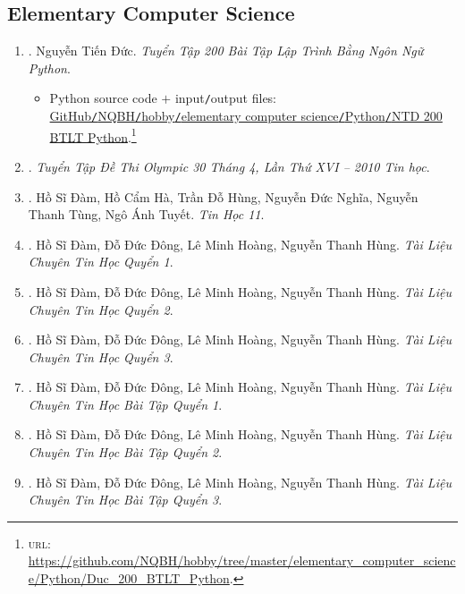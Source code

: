 \documentclass{article}
\begin{document}
\subsection{Elementary Computer Science}

\begin{enumerate}
	\item \cite{Duc_200_BT_Python}. Nguyễn Tiến Đức. {\it Tuyển Tập 200 Bài Tập Lập Trình Bằng Ngôn Ngữ Python}.\hfill{\sf[reading]}
	\begin{itemize}
		\item Python source code $+$ input{\tt/}output files:\\\href{https://github.com/NQBH/hobby/tree/master/elementary_computer_science/Python/Duc_200_BTLT_Python}{GitHub{\tt/}NQBH{\tt/}hobby{\tt/}elementary computer science{\tt/}Python{\tt/}NTD 200 BTLT Python}.\footnote{\textsc{url}: \url{https://github.com/NQBH/hobby/tree/master/elementary_computer_science/Python/Duc_200_BTLT_Python}.}
	\end{itemize}
	\item \cite{Olympic30-4_2010_Tin_Hoc}. {\it Tuyển Tập Đề Thi Olympic 30 Tháng 4, Lần Thứ XVI -- 2010 Tin học}.\hfill{\sf[reading]}
	\item \cite{SGK_Tin_Hoc_11}. Hồ Sĩ Đàm, Hồ Cẩm Hà, Trần Đỗ Hùng, Nguyễn Đức Nghĩa, Nguyễn Thanh Tùng, Ngô Ánh Tuyết. {\it Tin Học 11}.\\\mbox{}\hfill{\sf[done]}
	\item \cite{TL_chuyen_Tin_quyen_1}. Hồ Sĩ Đàm, Đỗ Đức Đông, Lê Minh Hoàng, Nguyễn Thanh Hùng. {\it Tài Liệu Chuyên Tin Học Quyển 1}.\hfill{\sf[reading]}
	\item \cite{TL_chuyen_Tin_quyen_2}. Hồ Sĩ Đàm, Đỗ Đức Đông, Lê Minh Hoàng, Nguyễn Thanh Hùng. {\it Tài Liệu Chuyên Tin Học Quyển 2}.\hfill{\sf[reading]}
	\item \cite{TL_chuyen_Tin_quyen_3}. Hồ Sĩ Đàm, Đỗ Đức Đông, Lê Minh Hoàng, Nguyễn Thanh Hùng. {\it Tài Liệu Chuyên Tin Học Quyển 3}.\hfill{\sf[reading]}
	\item \cite{TL_chuyen_Tin_BT_quyen_1}. Hồ Sĩ Đàm, Đỗ Đức Đông, Lê Minh Hoàng, Nguyễn Thanh Hùng. {\it Tài Liệu Chuyên Tin Học Bài Tập Quyển 1}.\\\mbox{}\hfill{\sf[reading]}
	\item \cite{TL_chuyen_Tin_BT_quyen_2}. Hồ Sĩ Đàm, Đỗ Đức Đông, Lê Minh Hoàng, Nguyễn Thanh Hùng. {\it Tài Liệu Chuyên Tin Học Bài Tập Quyển 2}.\\\mbox{}\hfill{\sf[reading]}
	\item \cite{TL_chuyen_Tin_BT_quyen_3}. Hồ Sĩ Đàm, Đỗ Đức Đông, Lê Minh Hoàng, Nguyễn Thanh Hùng. {\it Tài Liệu Chuyên Tin Học Bài Tập Quyển 3}.\\\mbox{}\hfill{\sf[reading]}

\end{enumerate}
\end{document}
